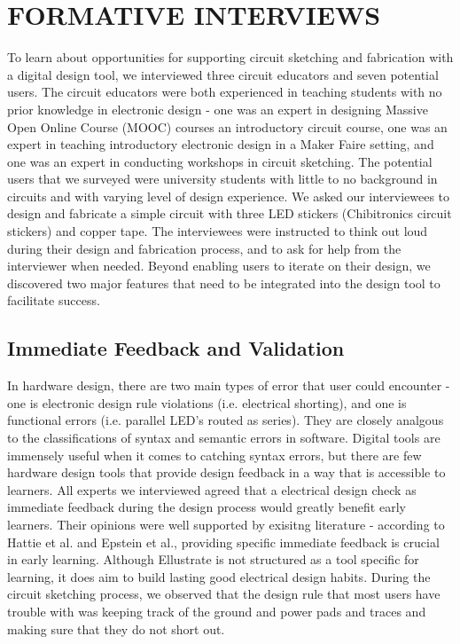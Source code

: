 \documentclass{sigchi}
\begin{document}


\section{FORMATIVE INTERVIEWS}

To learn about opportunities for supporting circuit sketching and fabrication with a digital design tool, we interviewed three circuit educators and seven potential users. The circuit educators were both experienced in teaching students with no prior knowledge in electronic design - one was an expert in designing Massive Open Online Course (MOOC) courses an introductory circuit course, one was an expert in teaching introductory electronic design in a Maker Faire setting, and one was an expert in conducting workshops in circuit sketching. The potential users that we surveyed were university students with little to no background in circuits and with varying level of design experience. We asked our interviewees to design and fabricate a simple circuit with three LED stickers (Chibitronics circuit stickers) and copper tape.
The interviewees were instructed to think out loud during their design and fabrication process, and to ask for help from the interviewer when needed. Beyond  enabling users to iterate on their design, we discovered two major features that need to be integrated into the design tool to facilitate success. 

\subsection{Immediate Feedback and Validation}
In hardware design, there are two main types of error that user could encounter - one is electronic design rule violations (i.e. electrical shorting), and one is functional errors (i.e. parallel LED's routed as series). They are closely analgous to the classifications of syntax and semantic errors in software. Digital tools are immensely useful when it comes to catching syntax errors, but there are few hardware design tools that provide design feedback in a way that is accessible to learners. All experts we interviewed agreed that a electrical design check as immediate feedback during the design process would greatly benefit early learners. Their opinions were well supported by exisitng literature - according to Hattie et al. and Epstein et al., providing specific immediate feedback is crucial in early learning. Although Ellustrate is not structured as a tool specific for learning, it does aim to build lasting good electrical design habits. During the circuit sketching process, we observed that the design rule that most users have trouble with was keeping track of the ground and power pads and traces and making sure that they do not short out. 
\end{document}
